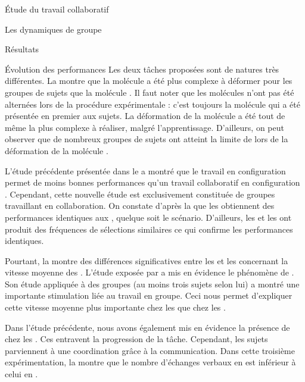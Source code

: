 \documentclass[myfrancais]{mythesis}
\begin{document}
\begin{mypart}{Étude du travail collaboratif}
\begin{mychapter}{Les dynamiques de groupe}
\begin{mysection}{Résultats}
\begin{mysubsection}{Évolution des performances}
					Les deux tâches proposées sont de natures très différentes.
					La  montre que la molécule \myUbiquitin a été plus complexe à déformer pour les groupes de sujets que la molécule \myPrion.
					Il faut noter que les molécules n'ont pas été alternées lors de la procédure expérimentale  : c'est toujours la molécule \myPrion qui a été présentée en premier aux sujets.
					La déformation de la molécule \myUbiquitin a été tout de même la plus complexe à réaliser, malgré l'apprentissage.
					D'ailleurs, on peut observer que de nombreux groupes de sujets ont atteint la limite de  lors de la déformation de la molécule \myUbiquitin.

					L'étude précédente présentée dans le  a montré que le travail en configuration  permet de moins bonnes performances qu'un travail collaboratif en configuration .
					Cependant, cette nouvelle étude est exclusivement constituée de groupes travaillant en collaboration.
					On constate d'après la  que les  obtiennent des performances identiques aux , quelque soit le scénario.
					D'ailleurs, les  et les  ont produit des fréquences de sélections similaires ce qui confirme les performances identiques.

					Pourtant, la  montre des différences significatives entre les  et les  concernant la vitesse moyenne des .
					L'étude exposée par  a mis en évidence le phénomène de .
					Son étude appliquée à des groupes (au moins trois sujets selon lui) a montré une importante stimulation liée au travail en groupe.
					Ceci nous permet d'expliquer cette vitesse moyenne plus importante chez les  que chez les .

					Dans l'étude précédente, nous avons également mis en évidence la présence de  chez les .
					Ces  entravent la progression de la tâche.
					Cependant, les sujets parviennent à une coordination grâce à la communication.
					Dans cette troisième expérimentation, la  montre que le nombre d'échanges verbaux en  est inférieur à celui en .


\end{mysubsection}
\end{mysection}
\end{mychapter}
\end{mypart}
\end{document}
